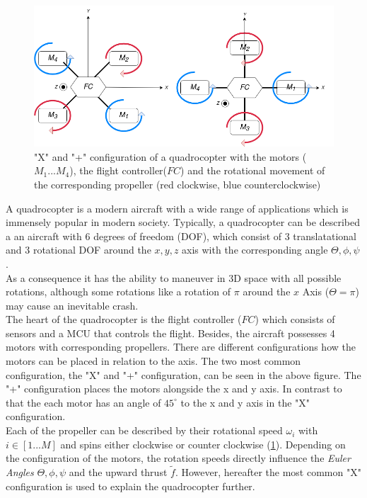 \begin{figure}
	\centering
	\includegraphics[width= \linewidth]{figures/quad.png} 
	\caption{"X" and "+" configuration of a quadrocopter with the motors ($M_1 ... M_4$), the flight controller($FC$) and the rotational movement of the corresponding propeller (red clockwise, blue counterclockwise)}
	\label{fig:quad}
\end{figure}

A quadrocopter is a modern aircraft with a wide range of applications which is immensely popular in modern society.  Typically, a quadrocopter can be described a an aircraft with 6 degrees of freedom (DOF), which consist of 3 translatational  and 3 rotational DOF around the $x,y,z$ axis with the corresponding angle $\Theta, \phi, \psi$. \\
As a consequence it has the ability to maneuver in 3D space with all possible rotations, although some rotations like a rotation of $\pi$ around the $x$ Axis ($\Theta = \pi$) may cause an inevitable crash. \\
The heart of the quadrocopter is the flight controller ($FC$) which consists of sensors and a MCU that controls the flight. Besides, the aircraft possesses 4 motors with corresponding propellers. There are different configurations how the motors can be placed in relation to the axis. The two most common configuration, the "X" and "+" configuration, can be seen in the above figure. The "+" configuration places the motors alongside the x and y axis. In contrast to that the each motor has an angle of $45^{\circ}$ to the x and y axis in the "X" configuration.\\
Each of the propeller can be described by their rotational speed $\omega_i$ with $i \in [1...M]$ and spins either clockwise or counter clockwise (\cref{fig:quad}).  Depending on the configuration of the motors,
the rotation speeds directly influence the \emph{Euler Angles} $\Theta, \phi, \psi$ and
the upward thrust $\tilde{f}$. However, hereafter the most common "X" configuration is used to explain the quadrocopter further.

